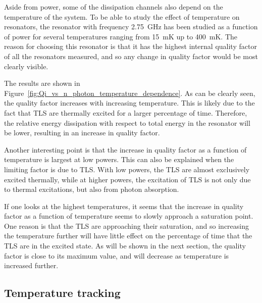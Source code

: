 \documentclass[12pt]{report}
\begin{document}
Aside from power, some of the dissipation channels also depend on the temperature of the system. To be able to study the effect of temperature on resonators, the resonator with frequency \SI{2.75}{\giga \hertz} has been studied as a function of power for several temperatures ranging from \SI{15}{\milli \kelvin} up to \SI{400}{\milli \kelvin}. The reason for choosing this resonator is that it has the highest internal quality factor of all the resonators measured, and so any change in quality factor would be most clearly visible.

The results are shown in Figure~\ref{fig:Qi_vs_n_photon_temperature_dependence}. As can be clearly seen, the quality factor increases with increasing temperature. This is likely due to the fact that TLS are thermally excited for a larger percentage of time. Therefore, the relative energy dissipation with respect to total energy in the resonator will be lower, resulting in an increase in quality factor.

Another interesting point is that the increase in quality factor as a function of temperature is largest at low powers. This can also be explained when the limiting factor is due to TLS. With low powers, the TLS are almost exclusively excited thermally, while at higher powers, the excitation of TLS is not only due to thermal excitations, but also from photon absorption.

If one looks at the highest temperatures, it seems that the increase in quality factor as a function of temperature seems to slowly approach a saturation point. One reason is that the TLS are approaching their saturation, and so increasing the temperature further will have little effect on the percentage of time that the TLS are in the excited state. As will be shown in the next section, the quality factor is close to its maximum value, and will decrease as temperature is increased further.



\subsection{Temperature tracking}
\label{resonator:results:temperature_tracking}
\end{document}
